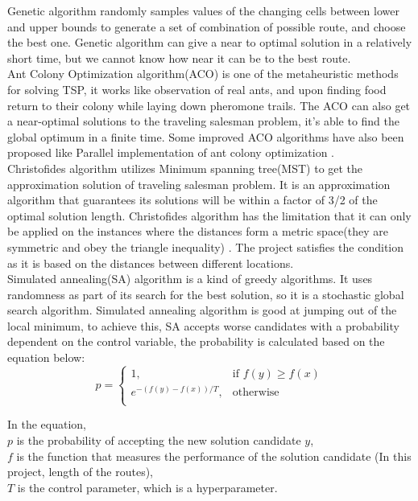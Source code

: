 \documentclass[project-plan]{report-template}
\begin{document}
Genetic algorithm randomly samples values of the changing cells between lower and upper bounds to generate
a set of combination of possible route, and choose the best one.
Genetic algorithm can give a near to optimal solution in a relatively short time, but we cannot know how near it can be to the best route.\\

Ant Colony Optimization algorithm(ACO) is one of the metaheuristic methods for solving TSP, 
it works like observation of real ants, and upon finding food return to their colony while laying down pheromone trails\cite{ACO_on_TSP}. 
The ACO can also get a near-optimal solutions to the traveling salesman problem, it's able to find the global optimum in a finite time.
Some improved ACO algorithms have also been proposed like Parallel implementation of ant colony optimization \cite{para_ACO}. \\

Christofides algorithm\cite{VANBEVERN2020118} utilizes Minimum spanning tree(MST) to get the approximation solution of traveling salesman problem.
It is an approximation algorithm that guarantees its solutions will be within a factor of 3/2 of the optimal solution length.
Christofides algorithm has the limitation that it can only be applied on the instances where the distances form a metric space(they are symmetric and obey the triangle inequality) \cite{christofides_inbook}.
The project satisfies the condition as it is based on the distances between different locations.\\

Simulated annealing(SA) algorithm is a kind of greedy algorithms. It uses randomness as part of its search for the best solution, so it is a stochastic global search algorithm.
Simulated annealing algorithm is good at jumping out of the local minimum\cite{improved_SA}, 
to achieve this, SA accepts worse candidates with a probability dependent on the control variable, the probability is calculated based on the equation below:\\

\begin{equation}
    p =
    \begin{cases}
    1, & \text{if } f(y) \geq f(x) \\
    e^{-(f(y)-f(x)) / T}, & \text{otherwise}\\
    \end{cases}
\end{equation}

In the equation, \\
$p$ is the probability of accepting the new solution candidate $y$,\\
$f$ is the function that measures the performance of the solution candidate (In this project, length of the routes),\\
$T$ is the control parameter, which is a hyperparameter.\\
\end{document}
